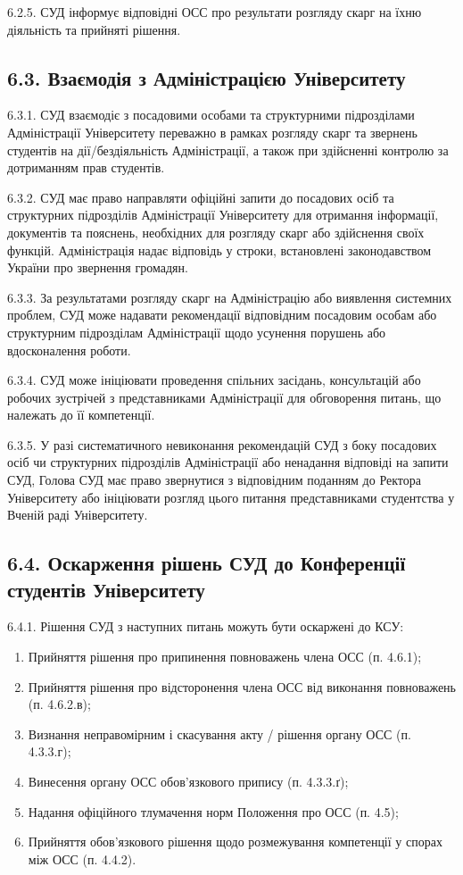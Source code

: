     6.2.5. СУД інформує відповідні ОСС про результати розгляду скарг на їхню діяльність та прийняті рішення.

\subsection*{6.3. Взаємодія з Адміністрацією Університету}
    6.3.1. СУД взаємодіє з посадовими особами та структурними підрозділами Адміністрації Університету переважно в рамках розгляду скарг та звернень студентів на дії/бездіяльність Адміністрації, а також при здійсненні контролю за дотриманням прав студентів.

    6.3.2. СУД має право направляти офіційні запити до посадових осіб та структурних підрозділів Адміністрації Університету для отримання інформації, документів та пояснень, необхідних для розгляду скарг або здійснення своїх функцій. Адміністрація надає відповідь у строки, встановлені законодавством України про звернення громадян.

    6.3.3. За результатами розгляду скарг на Адміністрацію або виявлення системних проблем, СУД може надавати рекомендації відповідним посадовим особам або структурним підрозділам Адміністрації щодо усунення порушень або вдосконалення роботи.

    6.3.4. СУД може ініціювати проведення спільних засідань, консультацій або робочих зустрічей з представниками Адміністрації для обговорення питань, що належать до її компетенції.

    6.3.5. У разі систематичного невиконання рекомендацій СУД з боку посадових осіб чи структурних підрозділів Адміністрації або ненадання відповіді на запити СУД, Голова СУД має право звернутися з відповідним поданням до Ректора Університету або ініціювати розгляд цього питання представниками студентства у Вченій раді Університету.

\subsection*{6.4. Оскарження рішень СУД до Конференції студентів Університету}
    6.4.1. Рішення СУД з наступних питань можуть бути оскаржені до КСУ:
        \begin{enumerate}[label=\alph*)]
            \item Прийняття рішення про припинення повноважень члена ОСС (п. 4.6.1);
            \item Прийняття рішення про відсторонення члена ОСС від виконання повноважень (п. 4.6.2.в);
            \item Визнання неправомірним і скасування акту / рішення органу ОСС (п. 4.3.3.г);
            \item Винесення органу ОСС обов'язкового припису (п. 4.3.3.ґ);
            \item Надання офіційного тлумачення норм Положення про ОСС (п. 4.5);
            \item Прийняття обов'язкового рішення щодо розмежування компетенції у спорах між ОСС (п. 4.4.2).
        \end{enumerate}

